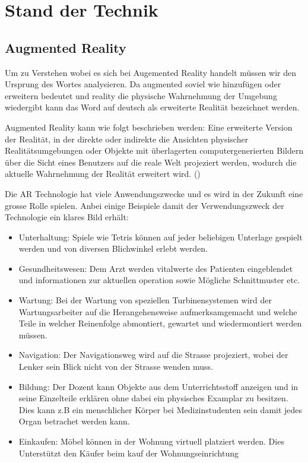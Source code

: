 \section{Stand der Technik}

\subsection{Augmented Reality} \label{sub:augmented-reality}
Um zu Verstehen wobei es sich bei Augemented Reality handelt müssen wir den Ursprung des Wortes analysieren. Da augmented soviel wie hinzufügen oder erweitern bedeutet und reality die physische Wahrnehmung der Umgebung wiedergibt kann das Word auf deutsch als erweiterte Realität bezeichnet werden.

Augmented Reality kann wie folgt beschrieben werden: Eine erweiterte Version der Realität, in der direkte oder indirekte die Ansichten physischer Realitätsumgebungen oder Objekte mit überlagerten computergenerierten Bildern über die Sicht eines Benutzers auf die reale Welt projeziert werden, wodurch die aktuelle Wahrnehmung der Realität erweitert wird. (\cite{reality-technologies})

Die AR Technologie hat viele Anwendungszwecke und es wird in der Zukunft eine grosse Rolle spielen. Anbei einige Beispiele damit der Verwendungszweck der Technologie ein klares Bild erhält:
\begin{itemize}
    \item Unterhaltung: Spiele wie Tetris können auf jeder beliebigen Unterlage gespielt werden und von diversen Blichwinkel erlebt werden.
    \item Gesundheitswesen: Dem Arzt werden vitalwerte des Patienten eingeblendet und informationen zur aktuellen operation sowie Mögliche Schnittmuster etc.
    \item Wartung: Bei der Wartung von speziellen Turbinensystemen wird der Wartungsarbeiter auf die Herangehensweise aufmerksamgemacht und welche Teile in welcher Reinenfolge abmontiert, gewartet und wiedermontiert werden müssen.
    \item Navigation: Der Navigationsweg wird auf die Strasse projeziert, wobei der Lenker sein Blick nicht von der Strasse wenden muss.
    \item Bildung: Der Dozent kann Objekte aus dem Unterrichtsstoff anzeigen und in seine Einzelteile erklären ohne dabei ein physisches Examplar zu besitzen. Dies kann z.B ein menschlicher Körper bei Medizinstudenten sein damit jedes Organ betrachet werden kann.
    \item Einkaufen: Möbel können in der Wohnung virtuell platziert werden. Dies Unterstützt den Käufer beim kauf der Wohnungseinrichtung
\end{itemize}

